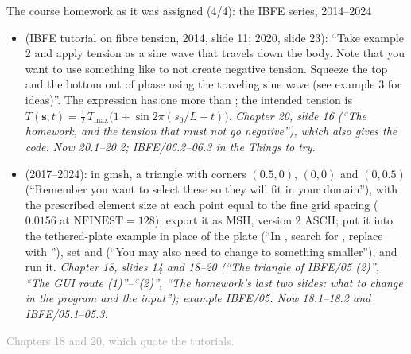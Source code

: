 \documentclass[aspectratio=169,11pt]{beamer}
\newcommand{\sourcecredit}[1]{\vfill\begin{flushright}\tiny\textcolor{DarkGray}{#1}\end{flushright}}
\begin{document}
\begin{frame}{The course homework as it was assigned (4/4): the IBFE series, 2014--2024}
\label{fr:hw4}
\footnotesize
\begin{itemize}\setlength{\itemsep}{3pt}
  \item {} (IBFE tutorial on fibre tension, 2014, slide 11; 2020, slide 23): ``Take example 2 and apply tension as a sine wave that travels down the body. Note that you want to use something like  to not create negative tension. Squeeze the top and the bottom out of phase using the traveling sine wave (see example 3 for ideas)''. The expression has one more \code{(} than \code{)}; the intended tension is $T(\mathbf{s}, t) = \tfrac12\,T_{\max}\bigl(1 + \sin 2\pi(s_0/L + t)\bigr)$. \emph{Chapter 20, slide 16 (``The homework, and the tension that must not go negative''), which also gives the code. Now 20.1--20.2; IBFE/06.2--06.3 in the Things to try.}
  \item {} (2017--2024): in gmsh, a triangle with corners $(0.5, 0)$, $(0, 0)$ and $(0, 0.5)$ (``Remember you want to select these so they will fit in your domain''), with the prescribed element size at each point equal to the fine grid spacing ($0.0156$ at $\mathrm{NFINEST} = 128$); export it as MSH, version 2 ASCII; put it into the tethered-plate example in place of the plate (``In , search for , replace with ''), set  and  (``You may also need to change  to something smaller''), and run it. \emph{Chapter 18, slides 14 and 18--20 (``The triangle of IBFE/05 (2)'', ``The GUI route (1)''--``(2)'', ``The homework's last two slides: what to change in the program and the input''); example IBFE/05. Now 18.1--18.2 and IBFE/05.1--05.3.}
\end{itemize}
\sourcecredit{Chapters 18 and 20, which quote the tutorials.}
\end{frame}
\end{document}
